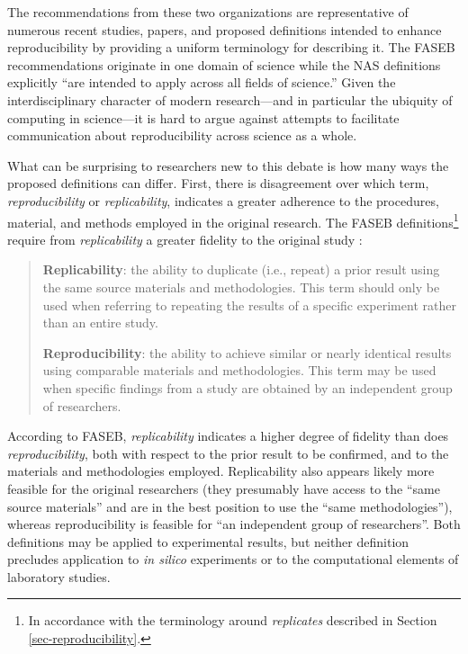The recommendations from these two organizations are representative of numerous recent studies, papers,
	and proposed definitions intended to enhance reproducibility by providing a uniform terminology
	for describing it.
The FASEB recommendations originate in one domain of science while the NAS definitions explicitly
	``are intended to apply across all fields of science.''
Given the interdisciplinary character of modern research---and in particular the ubiquity of computing in science---it
	is hard to argue against attempts to facilitate communication about reproducibility across science as a whole.

What can be surprising to researchers new to this debate is how many ways the proposed definitions
	can differ.
First, there is disagreement over which term, \emph{reproducibility} or \emph{replicability}, indicates
	 a greater adherence to the procedures, material,  and methods employed in the original research.
The FASEB definitions\footnote{In accordance with the terminology around \emph{replicates} described in Section\,\ref{sec-reproducibility}.}
	require from \emph{replicability} a greater fidelity to the original study \cite[p.3]{FASEB2016enhancing}:
        \begin{quote}
          \textbf{Replicability}: the ability to duplicate (i.e., repeat) a prior result using the same
          source materials and methodologies. This term should only be used when
	referring to repeating the results of a specific experiment rather than an
	entire study. \medskip

	\textbf{Reproducibility}: the ability to achieve similar or nearly identical results using comparable materials and methodologies.
	This term may be used when specific findings from a study are obtained by an independent group of researchers.
      \end{quote}
According to FASEB, \emph{replicability} indicates a higher degree of fidelity than does \emph{reproducibility},
	both with respect to the prior result to be confirmed, and to the materials and methodologies employed.
Replicability also appears likely more feasible for the original researchers (they presumably have access to the
	``same source materials'' and are in the best position to use the ``same methodologies''), whereas reproducibility is
	feasible for ``an independent group of researchers''.
Both definitions may be applied to experimental results, but neither definition precludes application to \emph{in silico}
	experiments or to the computational elements of laboratory studies.

